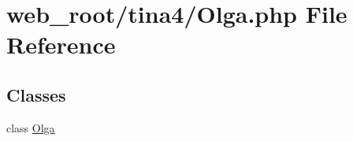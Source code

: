 \hypertarget{Olga_8php}{}\section{web\+\_\+root/tina4/\+Olga.php File Reference}
\label{Olga_8php}
\subsection*{Classes}
\begin{DoxyCompactItemize}
\item 
class \hyperlink{classOlga}{Olga}
\end{DoxyCompactItemize}
